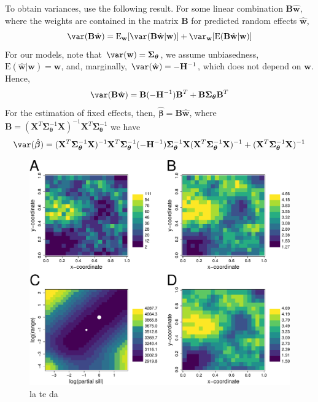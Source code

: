 \documentclass[12pt, titlepage]{article}
\begin{document}
To obtain variances, use the following result.  For some linear combination $\mathbf{B}\hat{\mathbf{w}}$, where the weights are contained in the matrix $\mathbf{B}$ for predicted random effects $\hat{\mathbf{w}}$, 
$$
\var(\mathbf{B}\hat{\mathbf{w}}) = \textrm{E}_{\mathbf{w}}[\var(\mathbf{B}\hat{\mathbf{w}}|\mathbf{w})] + \var_{\mathbf{w}}[\textrm{E}(\mathbf{B}\hat{\mathbf{w}}|\mathbf{w})]
$$
For our models, note that $\var(\mathbf{w}) = \boldsymbol{\Sigma_{\boldsymbol{\theta}}}$, we assume unbiasedness, $\textrm{E}(\hat{\mathbf{w}}|\mathbf{w}) = \mathbf{w}$, and, marginally, $\var(\hat{\mathbf{w}}) = -\mathbf{H}^{-1}$, which does not depend on $\mathbf{w}$.  Hence,
$$
\var(\mathbf{B}\hat{\mathbf{w}}) = \mathbf{B}(-\mathbf{H}^{-1})\mathbf{B}^{T} + \mathbf{B}\boldsymbol{\Sigma_{\boldsymbol{\theta}}}\mathbf{B}^{T}
$$ 
For the estimation of fixed effects, then, $\hat{\boldsymbol{\beta}} = \mathbf{B}\hat{\mathbf{w}}$, where $\mathbf{B} = (\mathbf{X}^{T}\boldsymbol{\Sigma}_{\boldsymbol{\theta}}^{-1}\mathbf{X})^{-1}\mathbf{X}^{T}\boldsymbol{\Sigma}_{\boldsymbol{\theta}}^{-1}$ we have
$$
\var(\hat{\boldsymbol{\beta}}) = (\mathbf{X}^{T}\boldsymbol{\Sigma}_{\boldsymbol{\theta}}^{-1}\mathbf{X})^{-1}\mathbf{X}^{T}\boldsymbol{\Sigma}_{\boldsymbol{\theta}}^{-1}(-\mathbf{H}^{-1})\boldsymbol{\Sigma}_{\boldsymbol{\theta}}^{-1}\mathbf{X}(\mathbf{X}^{T}\boldsymbol{\Sigma}_{\boldsymbol{\theta}}^{-1}\mathbf{X})^{-1} + (\mathbf{X}^{T}\boldsymbol{\Sigma}_{\boldsymbol{\theta}}^{-1}\mathbf{X})^{-1}
$$
\begin{figure}[H]
  \begin{center}
	    \includegraphics[width=.8\linewidth]{figures/sglm_likelihood_estimation}
  \end{center}
  \caption{la te da \label{Fig:sglm_likelihood_estimation}}
\end{figure}
\end{document}
